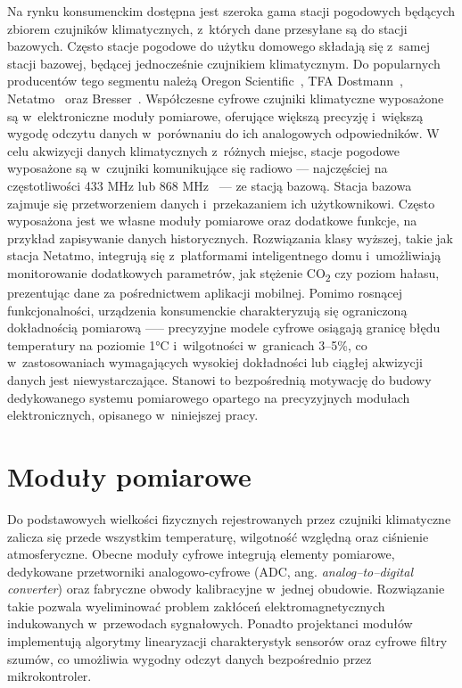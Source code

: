 Na rynku konsumenckim dostępna jest szeroka gama stacji pogodowych
będących zbiorem czujników klimatycznych, z~których dane przesyłane
są do stacji bazowych. Często stacje pogodowe do użytku domowego
składają się z~samej stacji bazowej, będącej jednocześnie 
czujnikiem klimatycznym.
Do popularnych producentów tego segmentu należą Oregon Scientific~\cite{oregon_scientific_weather_stations}, 
TFA Dostmann~\cite{tfa_dostmann_weather_stations}, Netatmo~\cite{netatmo_weather_station} oraz Bresser~\cite{bresser_weather_stations}. 
Współczesne cyfrowe czujniki klimatyczne wyposażone są w~elektroniczne 
moduły pomiarowe, oferujące większą precyzję i~większą wygodę odczytu 
danych w~porównaniu do ich analogowych odpowiedników.
W celu akwizycji danych klimatycznych z~różnych miejsc, stacje pogodowe
wyposażone są w~czujniki komunikujące się radiowo --- najczęściej na 
częstotliwości 433 MHz lub 868 MHz~\cite{tfa_dostmann_433_868mhz} --- ze stacją bazową. 
Stacja bazowa zajmuje się przetworzeniem danych i~przekazaniem 
ich użytkownikowi. Często wyposażona jest we własne moduły pomiarowe 
oraz dodatkowe funkcje, na przykład zapisywanie danych historycznych.
Rozwiązania klasy wyższej, takie jak stacja Netatmo, integrują się 
z~platformami inteligentnego domu i~umożliwiają monitorowanie dodatkowych 
parametrów, jak stężenie CO\textsubscript{2} czy poziom hałasu, 
prezentując dane za pośrednictwem aplikacji mobilnej. 
Pomimo rosnącej funkcjonalności, urządzenia konsumenckie charakteryzują 
się ograniczoną dokładnością pomiarową —-- precyzyjne modele cyfrowe 
osiągają granicę błędu temperatury na poziomie 1°C i~wilgotności 
w~granicach 3--5\%, co w~zastosowaniach wymagających wysokiej dokładności 
lub ciągłej akwizycji danych jest niewystarczające. 
Stanowi to bezpośrednią motywację do budowy dedykowanego systemu 
pomiarowego opartego na precyzyjnych modułach elektronicznych, 
opisanego w~niniejszej pracy.

\section{Moduły pomiarowe}
Do podstawowych wielkości fizycznych rejestrowanych przez czujniki 
klimatyczne zalicza się przede wszystkim temperaturę, wilgotność 
względną oraz ciśnienie atmosferyczne. Obecne moduły cyfrowe 
integrują elementy pomiarowe, dedykowane przetworniki analogowo-cyfrowe 
(ADC, ang. \textit{analog--to--digital converter}) oraz fabryczne 
obwody kalibracyjne w~jednej obudowie. Rozwiązanie takie pozwala 
wyeliminować problem zakłóceń elektromagnetycznych indukowanych 
w~przewodach sygnałowych. Ponadto projektanci modułów implementują 
algorytmy linearyzacji charakterystyk sensorów oraz cyfrowe filtry 
szumów, co umożliwia wygodny odczyt danych bezpośrednio przez 
mikrokontroler.

